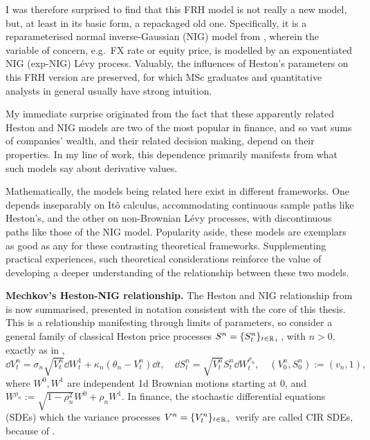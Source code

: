 I was therefore surprised to find that this FRH model is not really a new model, but, at least in its basic form, a repackaged old one. Specifically, it is a reparameterised normal inverse-Gaussian (NIG) model from \cite{barndorff-nielsen_1997}, wherein the variable of concern, e.g.~FX rate or equity price, is modelled by an exponentiated NIG (exp-NIG) L\'evy process. Valuably, the influences of Heston's parameters on this FRH version are preserved, for which MSc graduates and quantitative analysts in general usually have strong intuition.

My immediate surprise originated from the fact that these apparently related Heston and NIG models are two of the most popular in finance, and so vast sums of companies' wealth, and their related decision making, depend on their properties. In my line of work, this dependence primarily manifests from what such models say about derivative values.

Mathematically, the models being related here exist in different frameworks. One depends inseparably on It\^o calculus, accommodating continuous sample paths like Heston's, and the other on non-Brownian L\'evy processes, with discontinuous paths like those of the NIG model. Popularity aside, these models are exemplars as good as any for these contrasting theoretical frameworks. Supplementing practical experiences, such theoretical considerations reinforce the value of developing a deeper understanding of the relationship between these two models.

\vspace{3mm}\textbf{Mechkov's Heston-NIG relationship.} The Heston and NIG relationship from \cite{mechkov_2015} is now summarised, presented in notation consistent with the core of this thesis. This is a relationship manifesting through limits of parameters, so consider a general family of classical Heston price processes $S^n=\{S^n_t\}_{t\in\mathbb{R}_+}$, with $n>0$, exactly as in \cite{heston_1993},~
\begin{equation}\label{eq:heston_prologue}
    \dd V^n_t = \sigma_n\sqrt{V^n_t}\dd W^1_t + \kappa_n(\theta_n - V^n_t)\dd t,\quad \dd S^n_t = \sqrt{V^n_t}S^n_t\dd W^{\rho_n}_t,\quad (V^n_0,S^n_0) := (v_n,1),
\end{equation}
where $W^0,W^1$ are independent 1d Brownian motions starting at 0, and $W^{\rho_n}:=\sqrt{1-\rho_n^2}W^0+\rho_n W^1$. In finance, the stochastic differential equations (SDEs) which the variance processes $V^n=\{V^n_t\}_{t\in\mathbb{R}_+}$ verify are called CIR SDEs, because of \cite{cox_1985}.

